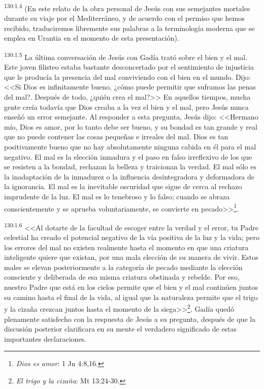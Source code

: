 \par 
\textsuperscript{130:1.4} (En este relato de la obra personal de Jesús con sus semejantes mortales durante su viaje por el Mediterráneo, y de acuerdo con el permiso que hemos recibido, traduciremos libremente sus palabras a la terminología moderna que se emplea en Urantia en el momento de esta presentación).

\par 
\textsuperscript{130:1.5} La última conversación de Jesús con Gadía trató sobre el bien y el mal. Este joven filisteo estaba bastante desconcertado por el sentimiento de injusticia que le producía la presencia del mal conviviendo con el bien en el mundo. Dijo: <<Si Dios es infinitamente bueno, ¿cómo puede permitir que suframos las penas del mal?. Después de todo, ¿quién crea el mal?>> En aquellos tiempos, mucha gente creía todavía que Dios creaba a la vez el bien y el mal, pero Jesús nunca enseñó un error semejante. Al responder a esta pregunta, Jesús dijo: <<Hermano mío, Dios es amor, por lo tanto debe ser bueno, y su bondad es tan grande y real que no puede contener las cosas pequeñas e irreales del mal. Dios es tan positivamente bueno que no hay absolutamente ninguna cabida en él para el mal negativo. El mal es la elección inmadura y el paso en falso irreflexivo de los que se resisten a la bondad, rechazan la belleza y traicionan la verdad. El mal sólo es la inadaptación de la inmadurez o la influencia desintegradora y deformadora de la ignorancia. El mal es la inevitable oscuridad que sigue de cerca al rechazo imprudente de la luz. El mal es lo tenebroso y lo falso; cuando se abraza conscientemente y se aprueba voluntariamente, se convierte en pecado>>\footnote{\textit{Dios es amor}: 1 Jn 4:8,16.}.

\par 
\textsuperscript{130:1.6} <<Al dotarte de la facultad de escoger entre la verdad y el error, tu Padre celestial ha creado el potencial negativo de la vía positiva de la luz y la vida; pero los errores del mal no existen realmente hasta el momento en que una criatura inteligente quiere que existan, por una mala elección de su manera de vivir. Estos males se elevan posteriormente a la categoría de pecado mediante la elección consciente y deliberada de esa misma criatura obstinada y rebelde. Por eso, nuestro Padre que está en los cielos permite que el bien y el mal continúen juntos su camino hasta el final de la vida, al igual que la naturaleza permite que el trigo y la cizaña crezcan juntos hasta el momento de la siega>>\footnote{\textit{El trigo y la cizaña}: Mt 13:24-30.}. Gadía quedó plenamente satisfecho con la respuesta de Jesús a su pregunta, después de que la discusión posterior clarificara en su mente el verdadero significado de estas importantes declaraciones.

